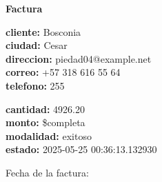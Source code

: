 \documentclass{article}
\begin{document}
\begin{center}
    {\LARGE \textbf{Factura}}\\[1cm]
\end{center}

\textbf{cliente:} Bosconia \\
\textbf{ciudad:} Cesar \\
\textbf{direccion:} piedad04@example.net \\
\textbf{correo:} +57 318 616 55 64 \\
\textbf{telefono:} 255 \\

\vspace{0.5cm}

\textbf{cantidad:} 4926.20 \\
\textbf{monto:} \$completa \\
\textbf{modalidad:} exitoso \\
\textbf{estado:} 2025-05-25 00:36:13.132930 \\

\vspace{1cm}

Fecha de la factura: 
\end{document}
